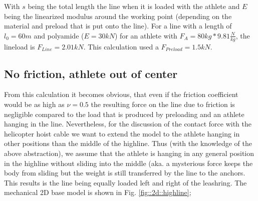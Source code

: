 \documentclass[a4paper,10pt]{scrartcl}
\begin{document}
With $s$ being the total length the line when it is loaded with the athlete and $E$ being the linearized modulus around the working point (depending on the material and preload that is put onto the line).
For a line with a length of $l_0=60m$ and polyamide ($E=30 kN$) for an athlete with $F_A=80kg*9.81\frac{N}{kg}$, the lineload is $F_{Line}=2.01 kN$. This calculation used a  $F_{Preload}=1.5kN$.

\subsection{No friction, athlete out of center}
From this calculation it becomes obvious, that even if the friction coefficient would be as high as $\nu=0.5$ the resulting force on the line due to friction is negligible compared to the load that is produced by preloading and an athlete hanging in the line. Nevertheless, for the discussion of the contact force with the helicopter hoist cable we want to extend the model to the athlete hanging in other positions than the middle of the highline. Thus (with the knowledge of the above abstraction), we assume that the athlete is hanging in any general position in the highline without sliding into the middle (aka. a mysterious force keeps the body from sliding but the weight is still transferred by the line to the anchors. This results is the line being equally loaded left and right of the leashring. The mechanical 2D base model is shown in Fig. \ref{fig::2d::highline};
\end{document}
